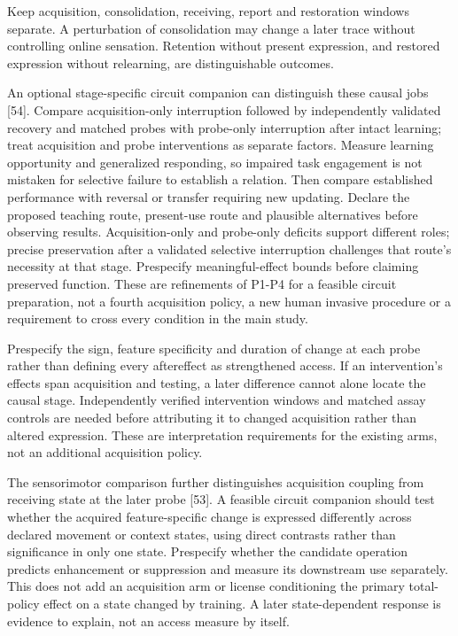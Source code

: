 \documentclass[
  american,
  11pt,
  letterpaper,
]{article}
\begin{document}
Keep acquisition, consolidation, receiving, report and restoration windows separate. A perturbation of consolidation may change a later trace without controlling online sensation. Retention without present expression, and restored expression without relearning, are distinguishable outcomes.

An optional stage-specific circuit companion can distinguish these causal jobs {[}54{]}. Compare acquisition-only interruption followed by independently validated recovery and matched probes with probe-only interruption after intact learning; treat acquisition and probe interventions as separate factors. Measure learning opportunity and generalized responding, so impaired task engagement is not mistaken for selective failure to establish a relation. Then compare established performance with reversal or transfer requiring new updating. Declare the proposed teaching route, present-use route and plausible alternatives before observing results. Acquisition-only and probe-only deficits support different roles; precise preservation after a validated selective interruption challenges that route's necessity at that stage. Prespecify meaningful-effect bounds before claiming preserved function. These are refinements of P1-P4 for a feasible circuit preparation, not a fourth acquisition policy, a new human invasive procedure or a requirement to cross every condition in the main study.

Prespecify the sign, feature specificity and duration of change at each probe rather than defining every aftereffect as strengthened access. If an intervention's effects span acquisition and testing, a later difference cannot alone locate the causal stage. Independently verified intervention windows and matched assay controls are needed before attributing it to changed acquisition rather than altered expression. These are interpretation requirements for the existing arms, not an additional acquisition policy.

The sensorimotor comparison further distinguishes acquisition coupling from receiving state at the later probe {[}53{]}. A feasible circuit companion should test whether the acquired feature-specific change is expressed differently across declared movement or context states, using direct contrasts rather than significance in only one state. Prespecify whether the candidate operation predicts enhancement or suppression and measure its downstream use separately. This does not add an acquisition arm or license conditioning the primary total-policy effect on a state changed by training. A later state-dependent response is evidence to explain, not an access measure by itself.
\end{document}
